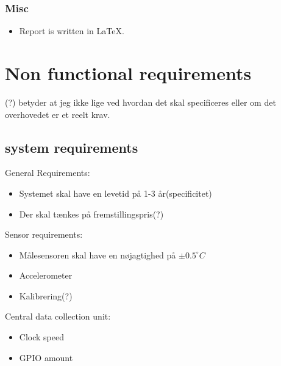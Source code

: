 \subsubsection{Misc}
\begin{itemize}
\item Report is written in LaTeX.
\end{itemize}

\section{Non functional requirements}
(?) betyder at jeg ikke lige ved hvordan det skal specificeres eller om det overhovedet er et reelt krav.\\
\subsection{system requirements }
General Requirements:\\
\begin{itemize}
\item Systemet skal have en levetid på 1-3 år(specificitet)
\item Der skal tænkes på fremstillingspris(?)
\end{itemize}
Sensor requirements:\\
\begin{itemize}
\item Målesensoren skal have en nøjagtighed på $\pm0.5 ^{\circ}C$
\item Accelerometer
\item Kalibrering(?)
\end{itemize}
Central data collection unit:\\
\begin{itemize}
\item Clock speed
\item GPIO amount
\end{itemize}



